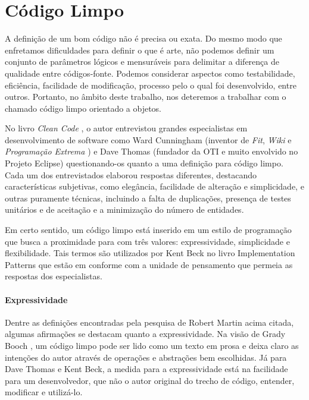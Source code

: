 \chapter{Código Limpo}
\label{chap:codigo_limpo}

A definição de um bom código não é precisa ou exata. Do mesmo modo que enfretamos dificuldades para definir o que é arte, não podemos definir um conjunto de parâmetros lógicos e mensuráveis para delimitar a diferença de qualidade entre códigos-fonte. Podemos considerar aspectos como testabilidade, eficiência, facilidade de modificação, processo pelo o qual foi desenvolvido, entre outros. Portanto, no âmbito deste trabalho, nos deteremos a trabalhar com o chamado código limpo orientado a objetos.

No livro \textit{Clean Code} \citep{Martin2008}, o autor entrevistou grandes especialistas em desenvolvimento de software como Ward Cunningham (inventor de \textit{Fit}, \textit{Wiki} e \textit{Programação Extrema} \citep{Beck1999}) e Dave Thomas (fundador da OTI e muito envolvido no Projeto Eclipse) questionando-os quanto a uma definição para código limpo. Cada um dos entrevistados elaborou respostas diferentes, destacando características subjetivas, como elegância, facilidade de alteração e simplicidade, e outras puramente técnicas, incluindo a falta de duplicações, presença de testes unitários e de aceitação e a minimização do número de entidades.

Em certo sentido, um código limpo está inserido em um estilo de programação que busca a proximidade para com três valores: expressividade, simplicidade e flexibilidade. Tais termos são utilizados por Kent Beck no livro Implementation Patterns \citep{Beck2007} que estão em conforme com a unidade de pensamento que permeia as respostas dos especialistas.

\subsubsection{Expressividade}
Dentre as definições encontradas pela pesquisa de Robert Martin acima citada, algumas afirmações se destacam quanto a expressividade. Na visão de Grady Booch \citep{Booch2007}, um código limpo pode ser lido como um texto em prosa e deixa claro as intenções do autor através de operações e abstrações bem escolhidas. Já para Dave Thomas e Kent Beck, a medida para a expressividade está na facilidade para um desenvolvedor, que não o autor original do trecho de código, entender, modificar e utilizá-lo.

